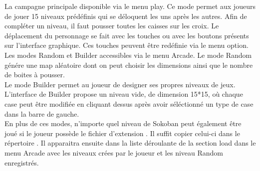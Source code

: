 \documentclass[../main.tex]{subfiles}
\begin{document}
La campagne principale disponible via le menu play. Ce mode permet aux joueurs de jouer
15 niveaux prédéfinis qui se déloquent les uns après les autres. Afin de compléter
un niveau, il faut pousser toutes les caisses sur les croix. Le déplacement du personnage se fait
avec les touches  ou avec les boutons présents sur l'interface graphique. Ces touches 
peuvent être redéfinie via le menu option. \\

Les modes Random et Builder accessibles via le menu Arcade. Le mode Random génére 
une map aléatoire dont on peut choisir les dimensions ainsi que le nombre de boites à pousser. \\
Le mode Builder permet au joueur de designer ses propres niveaux de jeux. \\
L'interface de Builder propose un niveau vide, de dimension 15*15, où chaque case peut être modifiée 
en cliquant dessus après avoir séléctionné un type de case dans la barre de gauche. \\

En plus de ces modes, n'importe quel niveau de Sokoban peut également être joué si le joueur possède le fichier d'extension .
Il suffit copier celui-ci dans le répertoire .
Il apparaitra ensuite dans la liste déroulante de la section load dans le menu Arcade avec les 
niveaux crées par le joueur et les niveau Random enregistrés.
\end{document}
